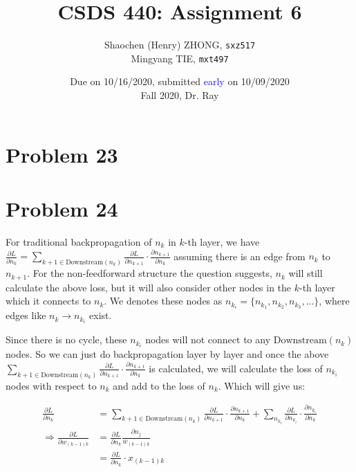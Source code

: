 \documentclass[12pt]{article}
\newcommand{\ilcode}{\texttt}
\newcommand{\p}{\partial}
\begin{document}
\title{\textbf{CSDS 440: Assignment 6}}

\author{Shaochen (Henry) ZHONG, \ilcode{sxz517} \\ Mingyang TIE, \ilcode{mxt497}}
\date{Due on 10/16/2020, submitted \textcolor{blue}{early} on 10/09/2020 \\ Fall 2020, Dr. Ray}
\maketitle


\section{Problem 23}

\section{Problem 24}


For traditional backpropagation of $n_k$ in $k$-th layer, we have $\frac{\p L}{\p n_k}  = \sum\limits_{k+1 \in \text{Downstream}(n_k)} \frac{\p L}{\p n_{k+1}} \cdot \frac{\p n_{k+1}}{\p n_k}$ assuming there is an edge from $n_k$ to $n_{k+1}$. For the non-feedforward structure the question suggests, $n_k$ will still calculate the above loss, but it will also consider other nodes in the $k$-th layer which it connects to $n_k$. We denotes these nodes as $n_{k_i} = \{n_{k_1}, n_{k_2}, n_{k_3}, ...\}$, where edges like $n_k \to n_{k_i}$ exist. \newline

Since there is no cycle, these $n_{k_i}$ nodes will not connect to any $\text{Downstream}(n_k)$ nodes. So we can just do backpropagation layer by layer and once the above $\sum\limits_{k+1 \in \text{Downstream}(n_k)} \frac{\p L}{\p n_{k+1}} \cdot \frac{\p n_{k+1}}{\p n_k}$ is calculated, we will calculate the loss of $n_{k_i}$ nodes with respect to $n_k$ and add to the loss of $n_k$. Which will give us:

\begin{align*}
    \frac{\p L}{\p n_k}  &= \sum\limits_{k+1 \in \text{Downstream}(n_k)} \frac{\p L}{\p n_{k+1}} \cdot \frac{\p n_{k+1}}{\p n_k} + \sum\limits_{n_{k_i}} \frac{\p L}{\p n_{k_i}} \cdot \frac{\p n_{k_i}}{\p n_k} \\
    \Longrightarrow \frac{\p L}{\p w_{(k-1)k}} &= \frac{\p L}{\p n_k} \frac{\p n_j}{w_{(k-1)k}} \\
    &= \frac{\p L}{\p n_k} \cdot x_{(k-1)k}
\end{align*}
\end{document}

